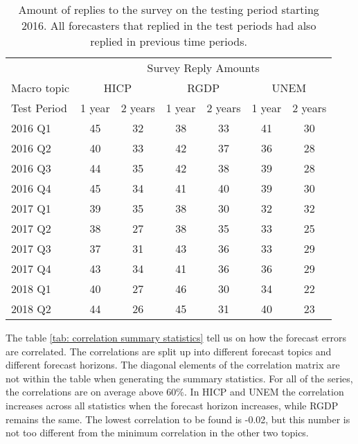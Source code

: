 \documentclass[11pt]{article}
\begin{document}
\begin{table}[!h]
	\centering
	\caption{Amount of replies to the survey on the testing period starting 2016. All forecasters that replied in the test periods had also replied in previous time periods.}
	\label{tab: amount per test period}
	\begin{tabular}{lcccccc}%
		\hline
		&\multicolumn{6}{c}{Survey Reply Amounts}\\
		\cmidrule(lr){2-7}
		Macro topic & \multicolumn{2}{c}{HICP} & \multicolumn{2}{c}{RGDP} & \multicolumn{2}{c}{UNEM} \\
		\cmidrule(lr){2-3} \cmidrule(lr){4-5}\cmidrule(lr){6-7}
		Test Period     & 1 year & 2 years & 1 year & 2 years & 1 year & 2 years \\ 
		\hline
		2016 Q1      & 45    & 32    & 38    & 33    & 41    & 30    \\
		2016 Q2      & 40    & 33    & 42    & 37    & 36    & 28    \\
		2016 Q3      & 44    & 35    & 42    & 38    & 39    & 28    \\
		2016 Q4      & 45    & 34    & 41    & 40    & 39    & 30    \\
		2017 Q1      & 39    & 35    & 38    & 30    & 32    & 32    \\
		2017 Q2      & 38    & 27    & 38    & 35    & 33    & 25    \\
		2017 Q3      & 37    & 31    & 43    & 36    & 33    & 29    \\
		2017 Q4      & 43    & 34    & 41    & 36    & 36    & 29    \\
		2018 Q1      & 40    & 27    & 46    & 30    & 34    & 22    \\
		2018 Q2      & 44    & 26    & 45    & 31    & 40    & 23    \\ 
		\hline
	\end{tabular}
\end{table}

The table \ref{tab: correlation summary statistics} tell us on how the
forecast errors are correlated. The correlations are split up into
different forecast topics and different forecast horizons. The diagonal
elements of the correlation matrix are not within the table when
generating the summary statistics. For all of the series, the
correlations are on average above 60\%. In HICP and UNEM the correlation
increases across all statistics when the forecast horizon increases,
while RGDP remains the same. The lowest correlation to be found is
-0.02, but this number is not too different from the minimum correlation
in the other two topics.
\end{document}

